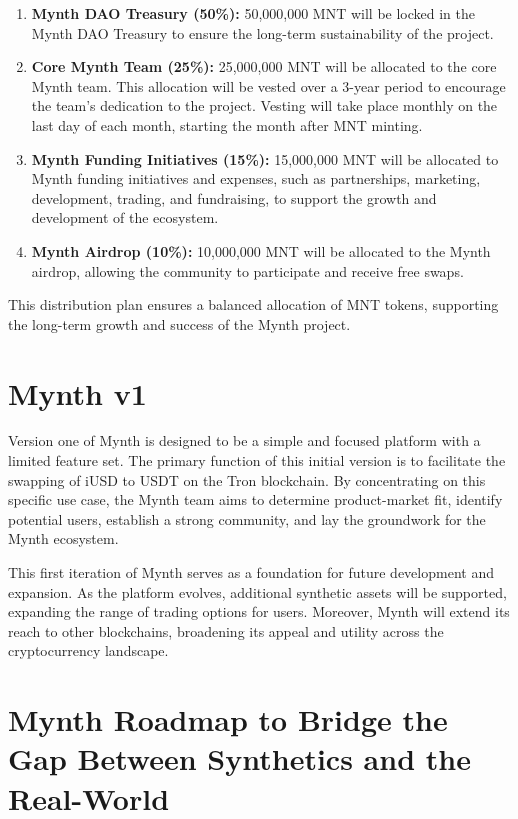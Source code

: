 \begin{enumerate}
\item
  \textbf{Mynth DAO Treasury (50\%):} 50,000,000 MNT will be locked in
  the Mynth DAO Treasury to ensure the long-term sustainability of the
  project.
\item
  \textbf{Core Mynth Team (25\%):} 25,000,000 MNT will be allocated to
  the core Mynth team. This allocation will be vested over a 3-year
  period to encourage the team's dedication to the project. Vesting will
  take place monthly on the last day of each month, starting the month
  after MNT minting.
\item
  \textbf{Mynth Funding Initiatives (15\%):} 15,000,000 MNT will be
  allocated to Mynth funding initiatives and expenses, such as
  partnerships, marketing, development, trading, and fundraising, to
  support the growth and development of the ecosystem.
\item
  \textbf{Mynth Airdrop (10\%):} 10,000,000 MNT will be allocated to the
  Mynth airdrop, allowing the community to participate and receive free
  swaps.
\end{enumerate}

This distribution plan ensures a balanced allocation of MNT tokens,
supporting the long-term growth and success of the Mynth project.

\hypertarget{mynth-v1}{%
\section{Mynth v1}\label{mynth-v1}}

Version one of Mynth is designed to be a simple and focused platform
with a limited feature set. The primary function of this initial version
is to facilitate the swapping of iUSD to USDT on the Tron blockchain. By
concentrating on this specific use case, the Mynth team aims to
determine product-market fit, identify potential users, establish a
strong community, and lay the groundwork for the Mynth ecosystem.

This first iteration of Mynth serves as a foundation for future
development and expansion. As the platform evolves, additional synthetic
assets will be supported, expanding the range of trading options for
users. Moreover, Mynth will extend its reach to other blockchains,
broadening its appeal and utility across the cryptocurrency landscape.

\hypertarget{mynth-roadmap-to-bridge-the-gap-between-synthetics-and-the-real-world}{%
\section{Mynth Roadmap to Bridge the Gap Between Synthetics and the
Real-World}\label{mynth-roadmap-to-bridge-the-gap-between-synthetics-and-the-real-world}}

